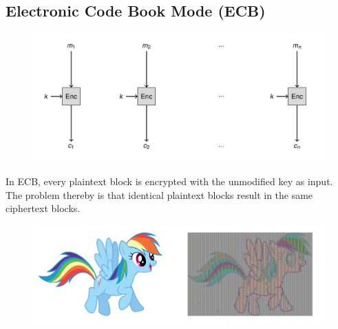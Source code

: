 \subsection{Electronic Code Book Mode (ECB)}
\begin{figure}[H]
  \centering
  \includegraphics[width=.8\textwidth]{figures/ecb.png}
\end{figure}
In ECB, every plaintext block is encrypted with the unmodified key as input.
The problem thereby is that identical plaintext blocks result in the same ciphertext blocks.
\begin{figure}[H]
  \centering
  \includegraphics[width=.8\textwidth]{figures/ecb_problem.png}
\end{figure}

